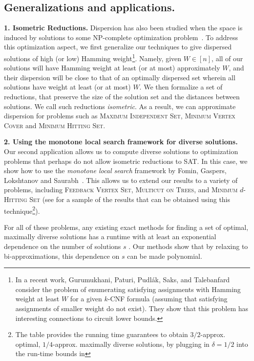 \documentclass[11pt, letterpaper]{article}
\theoremstyle{definition}
\begin{document}
\subsection{Generalizations and applications.} \label{intro_generalize}
\medskip\noindent
\textbf{1. Isometric Reductions. }Dispersion has also been studied when the space is induced by solutions to some NP-complete optimization problem~\cite{baste2019fpt,baste2022diversity}. To address this optimization aspect, we first generalize our techniques to give dispersed solutions of high (or low) Hamming weight\footnote{In a recent work, Gurumukhani, Paturi, Pudl\'{a}k, Saks, and Talebanfard~\cite{gurumukhani2024local} consider the problem of enumerating satisfying assignments with Hamming weight at least $W$ for a given $k$-CNF formula (assuming that satisfying assignments of smaller weight do not exist). They show that this problem has interesting connections to circuit lower bounds.}.
Namely, given $W \in [n]$, all of our solutions will have Hamming weight at least (or at most) approximately $W$, and their dispersion will be close to that of an optimally dispersed set wherein all solutions have weight at least (or at most) $W$. We then formalize a set of reductions, that preserve the size of the solution set and the distances between solutions. We call such reductions \emph{isometric}. As a result, we can approximate dispersion for problems such as \textsc{Maximum Independent Set}, \textsc{Minimum Vertex Cover} and \textsc{Minimum Hitting Set}. 

\medskip\noindent
\textbf{2. Using the monotone local search framework for diverse solutions.} Our second application allows us to compute diverse solutions to optimization problems that perhaps do not allow isometric reductions to SAT. In this case, we show how to use the \emph{monotone local search} framework by Fomin, Gaspers, Lokshtanov and Saurabh~\cite{ConicSearch}. This allows us to extend our results to a variety of problems, including \textsc{Feedback Vertex Set}, \textsc{Multicut on Trees}, and \textsc{Minimum $d$-Hitting Set} (see  for a sample of the results that can be obtained using this technique\footnote{The table provides the running time guarantees to obtain $3/2$-approx. optimal, $1/4$-approx. maximally diverse solutions, by plugging in $\delta=1/2$ into the run-time bounds in }).

For all of these problems, any existing exact methods for finding a set of optimal, maximally diverse solutions has a runtime with at least an exponential dependence on the number of solutions $s$ \cite{baste2019fpt,baste2022diversity}. Our methods show that by relaxing to bi-approximations, this dependence on $s$ can be made polynomial.  
\end{document}
